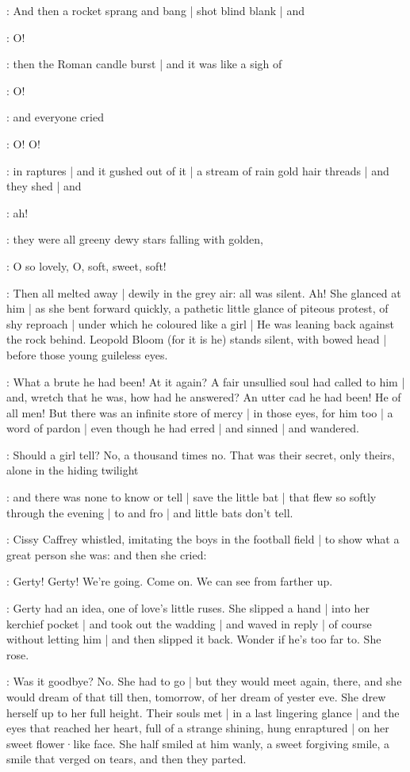 :
And then a rocket
sprang and bang |
shot blind blank |
and

\gertySex:
O!

:
then the Roman candle burst |
and it was like a sigh of

\gertySex:
O!

:
and everyone cried

\All:
O!
O!

:
in raptures |
and it gushed out of it |
a stream of rain gold hair threads |
and they shed |
and

\All:
ah!

:
they were
all greeny dewy stars falling with golden,%

\gertySex:
O so lovely,
O,
soft,
sweet,
soft!

\Nnovel:
Then all melted away |
dewily in the grey air:
all was silent.
Ah!
She glanced at him |
as she bent forward quickly,
a pathetic little glance of piteous protest,
of shy reproach |
under which he coloured like a girl |
He was leaning back against the rock behind.
Leopold Bloom
(for it is he)
stands silent,
with bowed head |
before those young guileless eyes.

\Nnovel:
What a brute he had been!
At it again?
A fair unsullied soul had called to him |
and,
wretch that he was,
how had he answered?
An utter cad
he had been!
He of all men!
But there was an infinite store of mercy |
in those eyes,
for him too |
a word of pardon |
even though he had erred |
and sinned |
and wandered.

\gertyNovel:
Should a girl tell?%
No,
a thousand times no.
That was their secret,
only theirs,
alone in the hiding twilight

:
and there was none to know or tell |
save the little bat |
that flew so softly through the evening |
to and fro |
and little bats don't tell.

:
Cissy Caffrey whistled,
imitating the boys in the football field |
to show what a great person she was:
and then she cried:

\cissy:
Gerty!
Gerty!
We're going.
Come on.
We can see from farther up.

\gertyNovel:
Gerty had an idea,
one of love's little ruses.
She slipped a hand |
into her kerchief pocket |
and took out the wadding |
and waved in reply |
of course 
without letting him |
and then slipped it back.
Wonder if he's too far to.
She rose.

\gertyRomantic:
Was it goodbye?%
No.
She had to go |
but they would meet again,
there,
and she would dream of that till then,
tomorrow,
of her dream of yester eve.
She drew herself up to her full height.
Their souls met |
in a last lingering glance |
and the eyes that reached her heart,
full of a strange shining,
hung enraptured |
on her sweet flower·like face.
She half smiled at him wanly,
a sweet forgiving smile,
a smile that verged on tears,
and then they parted.

